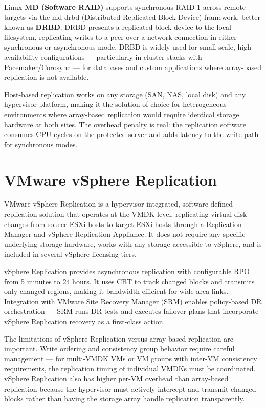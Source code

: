 Linux \textbf{MD (Software RAID)} supports synchronous RAID 1 across remote targets via the md-drbd (Distributed Replicated Block Device) framework, better known as \textbf{DRBD}. DRBD presents a replicated block device to the local filesystem, replicating writes to a peer over a network connection in either synchronous or asynchronous mode. DRBD is widely used for small-scale, high-availability configurations --- particularly in cluster stacks with Pacemaker/Corosync --- for databases and custom applications where array-based replication is not available.

Host-based replication works on any storage (SAN, NAS, local disk) and any hypervisor platform, making it the solution of choice for heterogeneous environments where array-based replication would require identical storage hardware at both sites. The overhead penalty is real: the replication software consumes CPU cycles on the protected server and adds latency to the write path for synchronous modes.

\section{VMware vSphere Replication}
VMware vSphere Replication is a hypervisor-integrated, software-defined replication solution that operates at the VMDK level, replicating virtual disk changes from source ESXi hosts to target ESXi hosts through a Replication Manager and vSphere Replication Appliance. It does not require any specific underlying storage hardware, works with any storage accessible to vSphere, and is included in several vSphere licensing tiers.

vSphere Replication provides asynchronous replication with configurable RPO from 5 minutes to 24 hours. It uses CBT to track changed blocks and transmits only changed regions, making it bandwidth-efficient for wide-area links. Integration with VMware Site Recovery Manager (SRM) enables policy-based DR orchestration --- SRM runs DR tests and executes failover plans that incorporate vSphere Replication recovery as a first-class action.

The limitations of vSphere Replication versus array-based replication are important. Write ordering and consistency group behavior require careful management --- for multi-VMDK VMs or VM groups with inter-VM consistency requirements, the replication timing of individual VMDKs must be coordinated. vSphere Replication also has higher per-VM overhead than array-based replication because the hypervisor must actively intercept and transmit changed blocks rather than having the storage array handle replication transparently.

